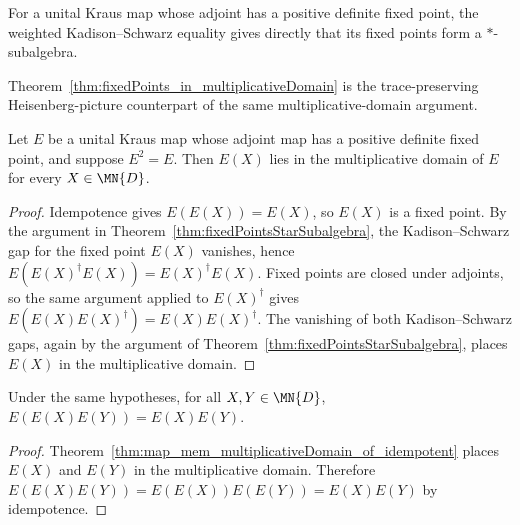 \begin{remark}
    \leanok
    For a unital Kraus map whose adjoint has a positive definite fixed point,
    the weighted Kadison--Schwarz equality gives directly that its fixed
    points form a $*$-subalgebra.
\end{remark}

\begin{remark}\leanok
    Theorem~\ref{thm:fixedPoints_in_multiplicativeDomain} is the
    trace-preserving Heisenberg-picture counterpart of the same
    multiplicative-domain argument.
\end{remark}

\begin{theorem}
    \label{thm:map_mem_multiplicativeDomain_of_idempotent}
    \leanok
    Let $E$ be a unital Kraus map whose adjoint map has a positive definite
    fixed point, and suppose $E^2=E$. Then $E(X)$ lies in the multiplicative
    domain of $E$ for every $X\in\MN{D}$.
\end{theorem}

\begin{proof}\leanok
    Idempotence gives $E(E(X))=E(X)$, so $E(X)$ is a fixed point.
    By the argument in Theorem~\ref{thm:fixedPointsStarSubalgebra}, the
    Kadison--Schwarz gap for the fixed point $E(X)$ vanishes, hence
    $E(E(X)^\dagger E(X))=E(X)^\dagger E(X)$.
    Fixed points are closed under adjoints, so the same argument applied to
    $E(X)^\dagger$ gives
    $E(E(X)E(X)^\dagger)=E(X)E(X)^\dagger$.
    The vanishing of both Kadison--Schwarz gaps, again by the argument of
    Theorem~\ref{thm:fixedPointsStarSubalgebra}, places $E(X)$ in the
    multiplicative domain.
\end{proof}

\begin{theorem}
    \label{thm:choi_effros_sandwich}
    \leanok
    Under the same hypotheses, for all $X,Y\in\MN{D}$,
    $E(E(X)E(Y))=E(X)E(Y)$.
\end{theorem}

\begin{proof}\leanok
    Theorem~\ref{thm:map_mem_multiplicativeDomain_of_idempotent} places
    $E(X)$ and $E(Y)$ in the multiplicative domain. Therefore
    $E(E(X)E(Y))=E(E(X))E(E(Y))=E(X)E(Y)$ by idempotence.
\end{proof}

